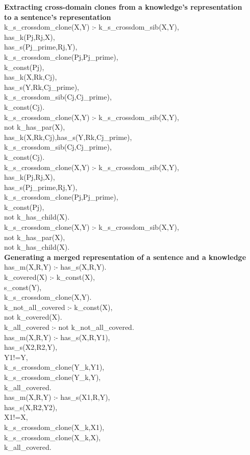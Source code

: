 \textbf{Extracting cross-domain clones from a knowledge’s representation\\
to a sentence’s representation}\\
k\_s\_crossdom\_clone(X,Y) :- k\_s\_crossdom\_sib(X,Y),\\
has\_k(Pj,Rj,X),\\
has\_s(Pj\_prime,Rj,Y),\\
k\_s\_crossdom\_clone(Pj,Pj\_prime),\\
k\_const(Pj),\\
has\_k(X,Rk,Cj),\\
has\_s(Y,Rk,Cj\_prime),\\
k\_s\_crossdom\_sib(Cj,Cj\_prime),\\
k\_const(Cj).\\
k\_s\_crossdom\_clone(X,Y) :- k\_s\_crossdom\_sib(X,Y),\\
not k\_has\_par(X),\\
has\_k(X,Rk,Cj),has\_s(Y,Rk,Cj\_prime),\\
k\_s\_crossdom\_sib(Cj,Cj\_prime),\\
k\_const(Cj).\\
k\_s\_crossdom\_clone(X,Y) :- k\_s\_crossdom\_sib(X,Y),\\
has\_k(Pj,Rj,X),\\
has\_s(Pj\_prime,Rj,Y),\\
k\_s\_crossdom\_clone(Pj,Pj\_prime),\\
k\_const(Pj),\\
not k\_has\_child(X).\\
k\_s\_crossdom\_clone(X,Y) :- k\_s\_crossdom\_sib(X,Y),\\
not k\_has\_par(X),\\
not k\_has\_child(X).\\

\textbf{Generating a merged representation of a sentence and a knowledge}\\
has\_m(X,R,Y) :- has\_s(X,R,Y).\\
k\_covered(X) :- k\_const(X),\\
s\_const(Y),\\
k\_s\_crossdom\_clone(X,Y).\\
k\_not\_all\_covered :- k\_const(X),\\
not k\_covered(X).\\
k\_all\_covered :- not k\_not\_all\_covered.\\
has\_m(X,R,Y) :- has\_s(X,R,Y1),\\
has\_s(X2,R2,Y),\\
Y1!=Y,\\
k\_s\_crossdom\_clone(Y\_k,Y1),\\
k\_s\_crossdom\_clone(Y\_k,Y),\\
k\_all\_covered.\\
has\_m(X,R,Y) :- has\_s(X1,R,Y),\\
has\_s(X,R2,Y2),\\
X1!=X,\\
k\_s\_crossdom\_clone(X\_k,X1),\\
k\_s\_crossdom\_clone(X\_k,X),\\
k\_all\_covered.\\

